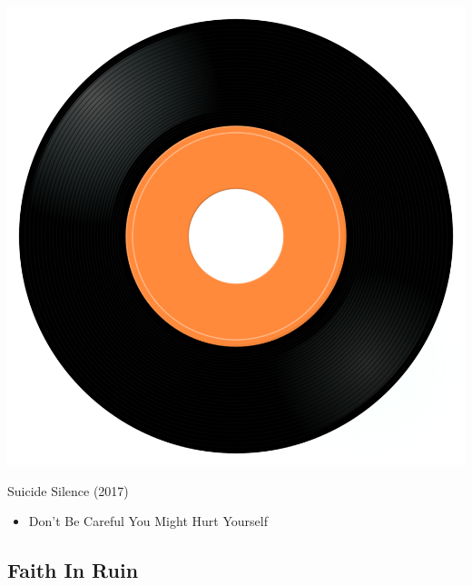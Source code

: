 \begin{minipage}[t]{0.25\textwidth}\vspace{0pt}
\captionsetup{type=figure}
\includegraphics[width=\textwidth]{Images/cover.png}
\caption*{Suicide Silence (2017)}
\end{minipage}
\begin{minipage}[t]{0.25\textwidth}\vspace{0pt}
\begin{itemize}[nosep,leftmargin=1em,labelwidth=*,align=left]
	\setlength{\itemsep}{0pt}
	\item Don't Be Careful You Might Hurt Yourself
\end{itemize}
\end{minipage}

\subsection{Faith In Ruin}

